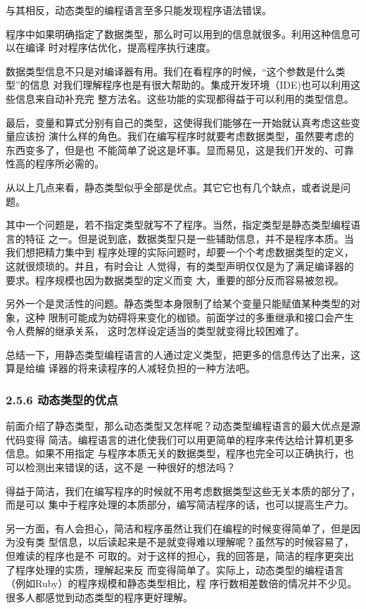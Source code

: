 \documentclass[11pt]{ctexart}
\begin{document}
与其相反，动态类型的编程语言至多只能发现程序语法错误。

程序中如果明确指定了数据类型，那么时可以用到的信息就很多。利用这种信息可以在编译
时对程序估优化，提高程序执行速度。

数据类型信息不只是对编译器有用。我们在看程序的时候，“这个参数是什么类型”的信息
对我们理解程序也是有很大帮助的。集成开发环境（IDE)也可以利用这些信息来自动补充完
整方法名。这些功能的实现都得益于可以利用的类型信息。

最后，变量和算式分别有自己的类型，这使得我们能够在一开始就认真考虑这些变量应该扮
演什么样的角色。我们在编写程序时就要考虑数据类型，虽然要考虑的东西变多了，但是也
不能简单了说这是坏事。显而易见，这是我们开发的、可靠性高的程序所必需的。

从以上几点来看，静态类型似乎全部是优点。其它它也有几个缺点，或者说是问题。

其中一个问题是，若不指定类型就写不了程序。当然，指定类型是静态类型编程语言的特征
之一。但是说到底，数据类型只是一些辅助信息，并不是程序本质。当我们想把精力集中到
程序处理的实际问题时，却要一个个考虑数据类型的定义，这就很烦琐的。并且，有时会让
人觉得，有的类型声明仅仅是为了满足编译器的要求。程序规模也因为数据类型的定义而变
大，重要的部分反而容易被忽视。

另外一个是灵活性的问题。静态类型本身限制了给某个变量只能赋值某种类型的对象，这种
限制可能成为妨碍将来变化的枷锁。前面学过的多重继承和接口会产生令人费解的继承关系，
这时怎样设定适当的类型就变得比较困难了。

总结一下，用静态类型编程语言的人通过定义类型，把更多的信息传达了出来，这算是给编
译器的将来读程序的人减轻负担的一种方法吧。
\subsubsection{2.5.6 动态类型的优点}
\label{sec:org34cfa67}

前面介绍了静态类型，那么动态类型又怎样呢？动态类型编程语言的最大优点是源代码变得
简洁。编程语言的进化使我们可以用更简单的程序来传达给计算机更多信息。如果不用指定
与程序本质无关的数据类型，程序也完全可以正确执行，也可以检测出来错误的话，这不是
一种很好的想法吗？

得益于简洁，我们在编写程序的时候就不用考虑数据类型这些无关本质的部分了，而是可以
集中于程序处理的本质部分，编写简洁程序的话，也可以提高生产力。

另一方面，有人会担心，简洁和程序虽然让我们在编程的时候变得简单了，但是因为没有类
型信息，以后读起来是不是就变得难以理解呢？虽然写的时候容易了，但难读的程序也是不
可取的。对于这样的担心，我的回答是，简洁的程序更突出了程序处理的实质，理解起来反
而变得简单了。实际上，动态类型的编程语言（例如Ruby）的程序规模和静态类型相比，程
序行数相差数倍的情况并不少见。很多人都感觉到动态类型的程序更好理解。
\end{document}
